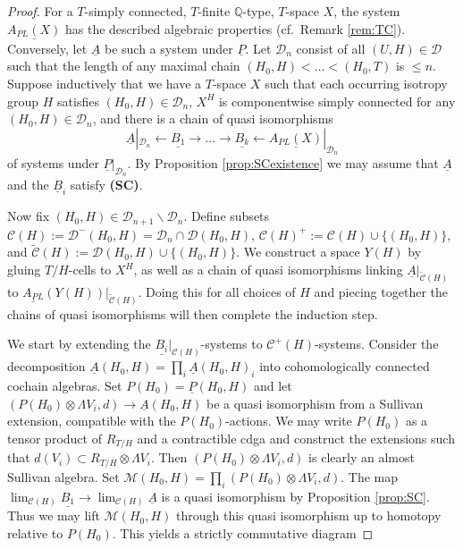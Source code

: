 \documentclass[12pt,a4paper]{article}
\theoremstyle{definition}
\begin{document}
\begin{proof} For a $T$-simply connected, $T$-finite $\mathbb{Q}$-type, $T$-space $X$, the system $\underline{A_{PL}(X)}$ has the described algebraic properties (cf.\ Remark \ref{rem:TC}). Conversely, let $\underline{A}$ be such a system under $\underline{P}$.
Let $\mathcal{D}_n$ consist of all $(U,H)\in \mathcal{D}$ such that the length of any maximal chain $(H_0,H)<\ldots<(H_0,T)$ is $\leq n$. Suppose inductively that we have a $T$-space $X$ such that each occurring isotropy group $H$ satisfies $(H_0,H)\in\mathcal{D}_n$, $X^H$ is componentwise {simply connected} for any $(H_0,H)\in \mathcal{D}_n$, and there is a chain of quasi isomorphisms \[\underline{A}|_{\mathcal{D}_n}\leftarrow \underline{B_1} \rightarrow\ldots\rightarrow \underline{B_k}\leftarrow \underline{A_{PL}(X)}|_{\mathcal{D}_n}\] of systems under $\underline{P}|_{\mathcal{D}_n}$. By  Proposition \ref{prop:SCexistence} we may assume that $\underline{A}$ and the $\underline{B}_i$ satisfy \textbf{(SC)}.

Now fix $(H_0,H)\in \mathcal{D}_{n+1}\backslash \mathcal{D}_n$. Define subsets $\mathcal{C}(H):=\mathcal{D}^-(H_0,H)=\mathcal{D}_n\cap \mathcal{D}(H_0,H)$, $\mathcal{C}(H)^+:= \mathcal{C}(H)\cup \{ (H_0,H)\}$, and $\tilde{\mathcal{C}}(H):=\mathcal{D}(H_0,H)\cup\{(H_0,H)\}$. We construct a space $Y(H)$ by gluing $T/H$-cells to $X^H$, as well as a chain of quasi isomorphisms linking $\underline{A}|_{\tilde{\mathcal{C}}(H)}$ to $\underline{A_{PL}}(Y(H))|_{\tilde{\mathcal{C}}(H)}$. Doing this for all choices of $H$ and piecing together the chains of quasi isomorphisms will then complete the induction step.

We start by extending the $\underline{B_i}|_{\mathcal{C}(H)}$-systems to $\mathcal{C}^+(H)$-systems. Consider the decomposition $\underline{A}(H_0,H)=\prod_i \underline{A}(H_0,H)_i$ into cohomologically connected cochain algebras. Set $P(H_0)=\underline{P}(H_0,H)$ and let $(P(H_0)\otimes \Lambda V_i,d)\rightarrow \underline{A}(H_0,H)$ be a quasi isomorphism from a Sullivan extension, compatible with the $P(H_0)$-actions. We may write $P(H_0)$ as a tensor product of $R_{T/H}$ and a contractible cdga and construct the extensions such that $d(V_i)\subset R_{T/H}\otimes \Lambda V_i$. Then $(P(H_0)\otimes \Lambda V_i,d)$ is clearly an almost Sullivan algebra. Set $\mathcal{M}(H_0,H)=\prod_i (P(H_0)\otimes\Lambda V_i,d)$. The map $\lim_{\mathcal{C}(H)}\underline{B_1}\rightarrow \lim_{\mathcal{C}(H)}\underline{A}$ is a quasi isomorphism by Proposition \ref{prop:SC}. Thus we may lift $\mathcal{M}(H_0,H)$ through this quasi isomorphism up to homotopy relative to $P(H_0)$. This yields a strictly commutative diagram


\end{proof}
\end{document}
